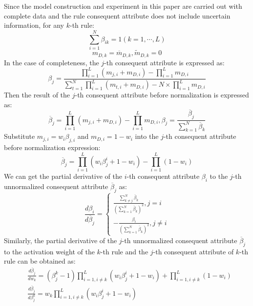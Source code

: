 \documentclass{ieeeaccess}
\begin{document}
Since the model construction and experiment in this paper are carried out with complete data and
the rule consequent attribute does not include uncertain information, for any $k$-th rule:
\begin{equation}
    \sum_{i=1}^N\beta_{ik}=1(k=1,\cdots,L)
\end{equation}
\begin{equation}
    m_{D,k}=\overline{m}_{D,k},\widetilde{m}_{D,k}=0
\end{equation}
In the case of completeness, the $j$-th consequent attribute is expressed as:
\begin{equation}
    \beta_j=\frac{\prod_{i=1}^L(m_{j,i}+m_{D,i})-\prod_{i=1}^Lm_{D,i}}{\sum_{t=1}^N\prod_{i=1}^L(m_{t,i}+m_{D,i})-N\times\prod_{i=1}^Lm_{D,i}}
\end{equation}
Then the result of the $j$-th consequent attribute before normalization is expressed as:
\begin{equation}
    \overline{\beta}_j = \prod_{i=1}^L(m_{j,i}+m_{D,i})-\prod_{i=1}^Lm_{D,i},\beta_j=\frac{\overline{\beta}_j}{\sum_{k=1}^N\overline{\beta}_k}
\end{equation}
Substitute $m_{j,i}=w_i\beta_{j,i}$ and $m_{D,i}=1-w_i$ into the $j$-th consequent attribute before normalization expression:
\begin{equation}
    \overline{\beta}_j = \prod_{i=1}^L(w_i\beta_j^i+1-w_i)-\prod_{i=1}^L{(1-w_i)}
\end{equation}
We can get the partial derivative of the $i$-th consequent attribute $\beta_i$ to the $j$-th unnormalized consequent attribute $\overline{\beta}_j$ as:
\begin{equation}
    \frac{d\beta_i}{d\overline{\beta}_j}=
    \left\{
    \begin{aligned}
        \frac{\sum_{k\neq j}^N\overline{\beta}_k}{(\sum_{k=1}^N\overline{\beta}_k)^2},j=i \\
        -\frac{\beta_i}{(\sum_{k=1}^N\overline{\beta}_k)^2},j\neq i
    \end{aligned}
    \right.
\end{equation}
Similarly, the partial derivative of the $j$-th unnormalized consequent attribute $\overline{\beta}_j$ to the activation weight of the $k$-th rule and the $j$-th consequent attribute of $k$-th rule can be obtained as:
\begin{align}
     & \frac{d\overline{\beta}_j}{dw_k}=(\beta_j^k-1)\prod_{i=1,i\neq k}^L(w_i\beta_j^i+1-w_i)+\prod_{i=1,i\neq k}^L(1-w_i) \\
     & \frac{d\overline{\beta}_j}{d\beta_j^k}=w_k\prod_{i=1,i\neq k}^L(w_i\beta_j^i+1-w_i)
\end{align}
\end{document}
